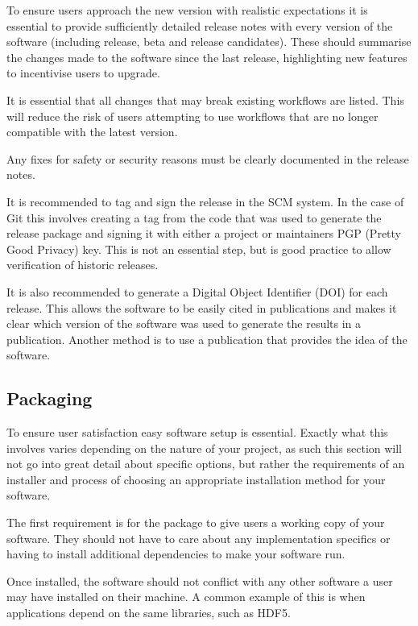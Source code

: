 \documentclass[jnr]{iosart2x}
\begin{document}
To ensure users approach the new version with realistic expectations it is essential to provide sufficiently detailed release notes with every version of the software (including release, beta and release candidates).
These should summarise the changes made to the software since the last release, highlighting new features to incentivise users to upgrade.

It is essential that all changes that may break existing workflows are listed.
This will reduce the risk of users attempting to use workflows that are no longer compatible with the latest version.

Any fixes for safety or security reasons must be clearly documented in the release notes.

It is recommended to tag and sign the release in the SCM system. In the case of Git this involves creating a tag from the code that was used to generate the release package and signing it with either a project or maintainers PGP (Pretty Good Privacy) key.
This is not an essential step, but is good practice to allow verification of historic releases.

It is also recommended to generate a Digital Object Identifier (DOI) for each release.
This allows the software to be easily cited in publications and makes it clear which version of the software was used to generate the results in a publication.
Another method is to use a publication that provides the idea of the software.

\subsection{Packaging}
\label{Packaging}

To ensure user satisfaction easy software setup is essential.
Exactly what this involves varies depending on the nature of your project, as such this section will not go into great detail about specific options, but rather the requirements of an installer and process of choosing an appropriate installation method for your software.

The first requirement is for the package to give users a working copy of your software.
They should not have to care about any implementation specifics or having to install additional dependencies to make your software run.

Once installed, the software should not conflict with any other software a user may have installed on their machine.
A common example of this is when applications depend on the same libraries, such as HDF5.
\end{document}
